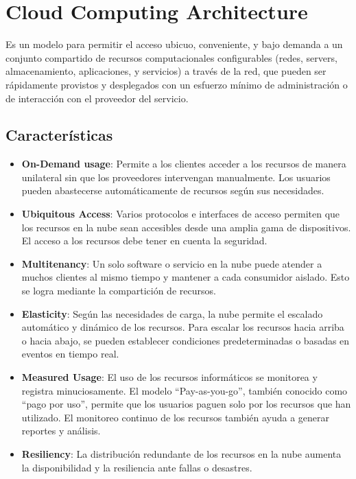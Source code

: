 \documentclass{article}
\begin{document}
		
		
		
		\section{Cloud Computing Architecture}
		Es un modelo para permitir el acceso ubicuo, conveniente, y bajo demanda a un conjunto compartido de recursos computacionales configurables (redes, servers, almacenamiento, aplicaciones, y servicios) a través de la red, que pueden ser rápidamente provistos y desplegados con un esfuerzo mínimo de administración o de interacción con el proveedor del servicio.
		
		\subsection{Características}
		
		\begin{itemize}
		
			\item {\textbf{On-Demand usage}}: Permite a los clientes acceder a los recursos de manera unilateral sin que los proveedores intervengan manualmente. Los usuarios pueden abastecerse automáticamente de recursos según sus necesidades.
		
			\item {\textbf{Ubiquitous Access}}: Varios protocolos e interfaces de acceso permiten que los recursos en la nube sean accesibles desde una amplia gama de dispositivos. El acceso a los recursos debe tener en cuenta la seguridad.
		
			\item {\textbf{Multitenancy}}: Un solo software o servicio en la nube puede atender a muchos clientes al mismo tiempo y mantener a cada consumidor aislado. Esto se logra mediante la compartición de recursos.
		
			\item {\textbf{Elasticity}}: Según las necesidades de carga, la nube permite el escalado automático y dinámico de los recursos. Para escalar los recursos hacia arriba o hacia abajo, se pueden establecer condiciones predeterminadas o basadas en eventos en tiempo real.
			
			\item {\textbf{Measured Usage}}: El uso de los recursos informáticos se monitorea y registra minuciosamente. El modelo ``Pay-as-you-go'', también conocido como ``pago por uso'', permite que los usuarios paguen solo por los recursos que han utilizado. El monitoreo continuo de los recursos también ayuda a generar reportes y análisis.
			
			
			\item {\textbf{Resiliency}}: La distribución redundante de los recursos en la nube aumenta la disponibilidad y la resiliencia ante fallas o desastres.
			
		\end{itemize}
\end{document}
